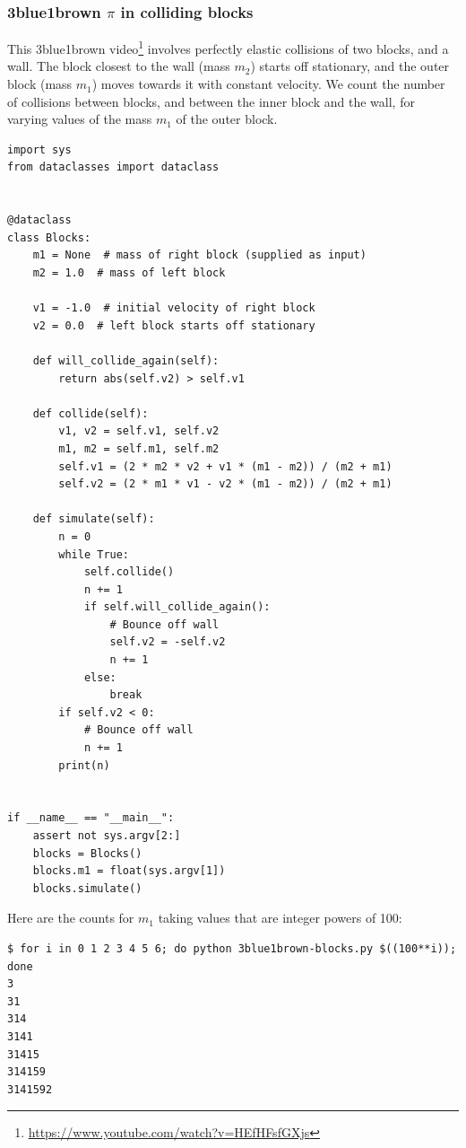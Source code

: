 \newpage
\subsubsection{3blue1brown $\pi$ in colliding blocks}

This 3blue1brown video\footnote{\url{https://www.youtube.com/watch?v=HEfHFsfGXjs}} involves
perfectly elastic collisions of two blocks, and a wall. The block closest to the wall (mass $m_2$)
starts off stationary, and the outer block (mass $m_1$) moves towards it with constant velocity. We
count the number of collisions between blocks, and between the inner block and the wall, for varying
values of the mass $m_1$ of the outer block.

\begin{verbatim}
import sys
from dataclasses import dataclass


@dataclass
class Blocks:
    m1 = None  # mass of right block (supplied as input)
    m2 = 1.0  # mass of left block

    v1 = -1.0  # initial velocity of right block
    v2 = 0.0  # left block starts off stationary

    def will_collide_again(self):
        return abs(self.v2) > self.v1

    def collide(self):
        v1, v2 = self.v1, self.v2
        m1, m2 = self.m1, self.m2
        self.v1 = (2 * m2 * v2 + v1 * (m1 - m2)) / (m2 + m1)
        self.v2 = (2 * m1 * v1 - v2 * (m1 - m2)) / (m2 + m1)

    def simulate(self):
        n = 0
        while True:
            self.collide()
            n += 1
            if self.will_collide_again():
                # Bounce off wall
                self.v2 = -self.v2
                n += 1
            else:
                break
        if self.v2 < 0:
            # Bounce off wall
            n += 1
        print(n)


if __name__ == "__main__":
    assert not sys.argv[2:]
    blocks = Blocks()
    blocks.m1 = float(sys.argv[1])
    blocks.simulate()
\end{verbatim}

Here are the counts for $m_1$ taking values that are integer powers of 100:

\begin{verbatim}
$ for i in 0 1 2 3 4 5 6; do python 3blue1brown-blocks.py $((100**i)); done
3
31
314
3141
31415
314159
3141592
\end{verbatim}


